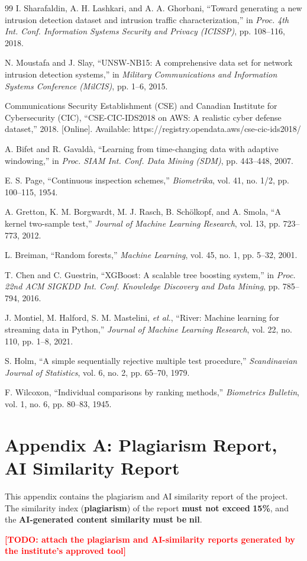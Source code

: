 \documentclass{article}
\newcommand{\todo}[1]{\textcolor{red}{\textbf{[TODO: #1]}}}
\begin{document}
\begin{thebibliography}{99}
I. Sharafaldin, A. H. Lashkari, and A. A. Ghorbani,
``Toward generating a new intrusion detection dataset and intrusion traffic characterization,''
in \textit{Proc. 4th Int. Conf. Information Systems Security and Privacy (ICISSP)}, pp. 108--116, 2018.

N. Moustafa and J. Slay,
``UNSW-NB15: A comprehensive data set for network intrusion detection systems,''
in \textit{Military Communications and Information Systems Conference (MilCIS)}, pp. 1--6, 2015.

Communications Security Establishment (CSE) and Canadian Institute for Cybersecurity (CIC),
``CSE-CIC-IDS2018 on AWS: A realistic cyber defense dataset,'' 2018.
[Online]. Available: https://registry.opendata.aws/cse-cic-ids2018/

A. Bifet and R. Gavald\`a,
``Learning from time-changing data with adaptive windowing,''
in \textit{Proc. SIAM Int. Conf. Data Mining (SDM)}, pp. 443--448, 2007.

E. S. Page,
``Continuous inspection schemes,''
\textit{Biometrika}, vol. 41, no. 1/2, pp. 100--115, 1954.

A. Gretton, K. M. Borgwardt, M. J. Rasch, B. Sch\"olkopf, and A. Smola,
``A kernel two-sample test,''
\textit{Journal of Machine Learning Research}, vol. 13, pp. 723--773, 2012.

L. Breiman,
``Random forests,''
\textit{Machine Learning}, vol. 45, no. 1, pp. 5--32, 2001.

T. Chen and C. Guestrin,
``XGBoost: A scalable tree boosting system,''
in \textit{Proc. 22nd ACM SIGKDD Int. Conf. Knowledge Discovery and Data Mining}, pp. 785--794, 2016.

J. Montiel, M. Halford, S. M. Mastelini, \textit{et al.},
``River: Machine learning for streaming data in Python,''
\textit{Journal of Machine Learning Research}, vol. 22, no. 110, pp. 1--8, 2021.

S. Holm,
``A simple sequentially rejective multiple test procedure,''
\textit{Scandinavian Journal of Statistics}, vol. 6, no. 2, pp. 65--70, 1979.

F. Wilcoxon,
``Individual comparisons by ranking methods,''
\textit{Biometrics Bulletin}, vol. 1, no. 6, pp. 80--83, 1945.

\end{thebibliography}

\pagebreak
\appendix
\section{Appendix A: Plagiarism Report, AI Similarity Report}
This appendix contains the plagiarism and AI similarity report of the project. The similarity index (\textbf{plagiarism}) of the report \textbf{must not exceed} \textbf{15\%}, and the \textbf{AI-generated content similarity} \textbf{must be} \textbf{nil}.

\todo{attach the plagiarism and AI-similarity reports generated by the institute's approved tool}
\end{document}
